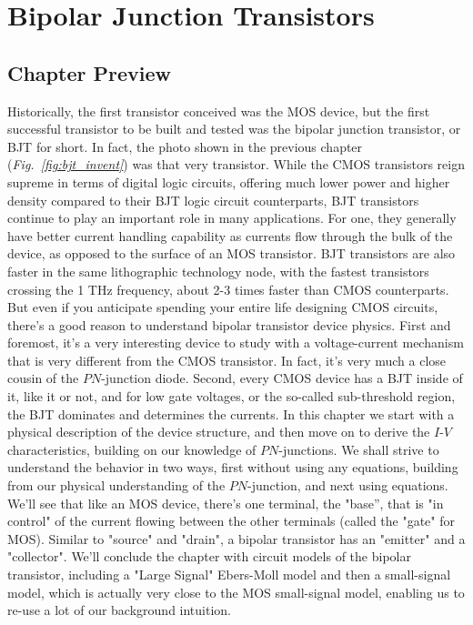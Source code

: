 \chapter{Bipolar Junction Transistors}
\label{ch:ch11_bjt}
\graphicspath{{./figs_bjt/}}
\section{Chapter Preview}
Historically, the first transistor conceived was the MOS device, but the first successful transistor to be built and tested was the bipolar junction transistor, or BJT for short.  In fact, the photo shown in the previous chapter (\emph{Fig.~\ref{fig:bjt_invent}}) was that very transistor.  While the CMOS transistors reign supreme in terms of digital logic circuits, offering much lower power and higher density compared to their BJT logic circuit counterparts, BJT transistors continue to play an important role in many applications.  For one, they generally have better current handling capability as currents flow through the bulk of the device, as opposed to the surface of an MOS transistor.  BJT transistors are also faster in the same lithographic technology node, with the fastest transistors crossing the 1 THz frequency, about 2-3 times faster than CMOS counterparts.  But even if you anticipate spending your entire life designing CMOS circuits, there's a good reason to understand bipolar transistor device physics.  First and foremost, it's a very interesting device to study with a voltage-current mechanism that is very different from the CMOS transistor.  In fact, it's very much a close cousin of the $PN$-junction diode.  Second, every CMOS device has a BJT inside of it, like it or not, and for low gate voltages, or the so-called sub-threshold region, the BJT dominates and determines the currents.  
In this chapter we start with a physical description of the device structure, and then move on to derive the $I$-$V$ characteristics, building on our knowledge of $PN$-junctions. We shall strive to understand the behavior in two ways, first without using any equations, building from our physical understanding of the $PN$-junction, and next using equations.  We'll see that like an MOS device, there's one terminal, the "base'', that is "in control" of the current flowing between the other terminals (called the "gate" for MOS).  Similar to "source" and "drain", a bipolar transistor has an "emitter" and a "collector".   We'll conclude the chapter with circuit models of the bipolar transistor, including a "Large Signal" Ebers-Moll model and then a small-signal model, which is actually very close to the MOS small-signal model, enabling us to re-use a lot of our background intuition.
